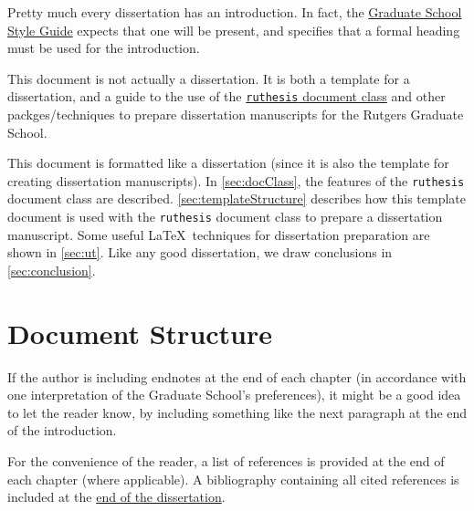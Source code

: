 Pretty much every dissertation has an introduction.
In fact, the \href{http://gsnb.rutgers.edu/guide.php3}{Graduate School Style Guide} expects that one will be present, and specifies that a formal heading must be used for the introduction.

This document is not actually a dissertation.
It is both a template for a dissertation, and a guide to the use of the \href{../ruthesis.cls}{\texttt{ruthesis} document class} and other packges/techniques to prepare dissertation manuscripts for the Rutgers Graduate School.

This document is formatted like a dissertation (since it is also the template for creating dissertation manuscripts).
In \autoref{sec:docClass}, the features of the \texttt{ruthesis} document class are described.
\autoref{sec:templateStructure} describes how this template document is used with the \texttt{ruthesis} document class to prepare a dissertation manuscript.
Some useful \LaTeX\ techniques for dissertation preparation are shown in \autoref{sec:ut}.
Like any good dissertation, we draw conclusions in \autoref{sec:conclusion}.
%
\ifperchapterbib%
\section[Document Structure]{\protect{\cbstart}Document Structure}%
\label{sec:introduction:roadmap}%
If the author is including endnotes at the end of each chapter (in accordance with one interpretation of the Graduate School's preferences), it might be a good idea to let the reader know, by including something like the next paragraph at the end of the introduction.

For the convenience of the reader, a list of references is provided at the end of each chapter (where applicable).
\ifendbib%
A bibliography containing all cited references is included at the \hyperref[sec:bibliography]{end of the dissertation}.
\else\fi%
\cbend%
\else\fi%